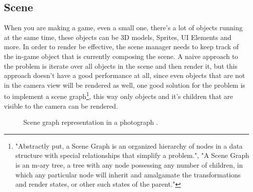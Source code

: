 \subsection{Scene}
When you are making a game, even a small one, there's a lot of objects running at the same time, these objects can be 3D models, Sprites, UI Elements and more\cite{ObjectOrientedGameProgrammingTheSceneSystem}. In order to render be effective, the scene manager needs to keep track of the in-game object that is currently composing the scene. A naive approach to the problem is iterate over all objects in the scene and then render it, but this approach doesn't have a good performance at all, since even objects that are not in the camera view will be rendered as well, one good solution for the problem is to implement a scene graph\footnote{"Abstractly put, a Scene Graph is an organized hierarchy of nodes in a data structure with special relationships that simplify a problem.", "A Scene Graph is an m-ary tree, a tree with any node possessing any number of children, in which any particular node will inherit and amalgamate the transformations and render states, or other such states of the parent."\cite{ObjectOrientedSceneManagement}}, this way only objects and it's children that are visible to the camera can be rendered\cite{3DGameEngineDesign}.

\begin{figure*}[!t]
\centering
{} \caption{Scene graph representation in a photograph \cite{SceneGraphRepresentationAndLearning}.}
\label{scene-graph}
\end{figure*}